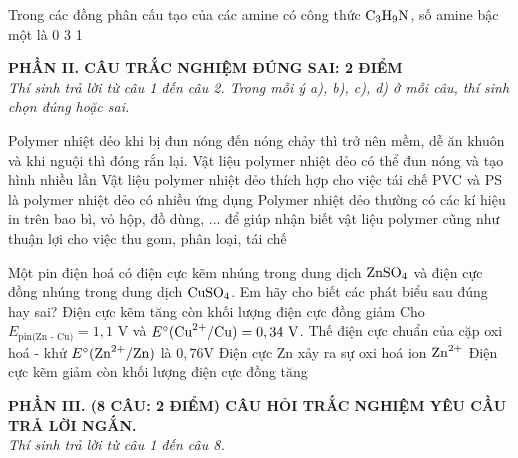\documentclass[11pt,a4paper]{article}
\begin{document}
\begin{ex}
Trong các đồng phân cấu tạo của các amine có công thức $\ce{C3H9N}$, số amine bậc một là
\choice
{0}
{3}
{}
{1}
\end{ex}
\vspace{4pt}
\noindent
{\color{mainGreen}\textbf{\large PHẦN II. CÂU TRẮC NGHIỆM ĐÚNG SAI: 2 ĐIỂM}}\\
\textit{\small Thí sinh trả lời từ câu 1 đến câu 2. Trong mỗi ý a), b), c), d) ở mỗi câu, thí sinh chọn đúng hoặc sai.}
\vspace{2pt}

\begin{ex}
Polymer nhiệt dẻo khi bị đun nóng đến nóng chảy thì trở nên mềm, dễ ăn khuôn và khi nguội thì đóng rắn lại.
\choiceTF
{\True Vật liệu polymer nhiệt dẻo có thể đun nóng và tạo hình nhiều lần}
{\True Vật liệu polymer nhiệt dẻo thích hợp cho việc tái chế}
{\True PVC và PS là polymer nhiệt dẻo có nhiều ứng dụng}
{\True Polymer nhiệt dẻo thường có các kí hiệu in trên bao bì, vỏ hộp, đồ dùng, ... để giúp nhận biết vật liệu polymer cũng như thuận lợi cho việc thu gom, phân loại, tái chế}
\end{ex}
\begin{ex}
Một pin điện hoá có điện cực kẽm nhúng trong dung dịch $\ce{ZnSO4}$ và điện cực đồng nhúng trong dung dịch $\ce{CuSO4}$. Em hãy cho biết các phát biểu sau đúng hay sai?
\choiceTF
{Điện cực kẽm tăng còn khối lượng điện cực đồng giảm}
{Cho $E_\text{pin(Zn - Cu)} = 1,1\text{ V}$ và $E^\circ(\ce{Cu^2+}/\ce{Cu}) = 0,34\text{ V}$. Thế điện cực chuẩn của cặp oxi hoá - khử $E^\circ(\ce{Zn^2+}/\ce{Zn})$ là $0,76\text{V}$}
{Điện cực Zn xảy ra sự oxi hoá ion $\ce{Zn^2+}$}
{\True Điện cực kẽm giảm còn khối lượng điện cực đồng tăng}
\end{ex}
\vspace{4pt}
\noindent
{\color{mainGreen}\textbf{\large PHẦN III. (8 CÂU: 2 ĐIỂM) CÂU HỎI TRẮC NGHIỆM YÊU CẦU TRẢ LỜI NGẮN.}}\\
\textit{\small Thí sinh trả lời từ câu 1 đến câu 8.}
\vspace{2pt}
\end{document}
